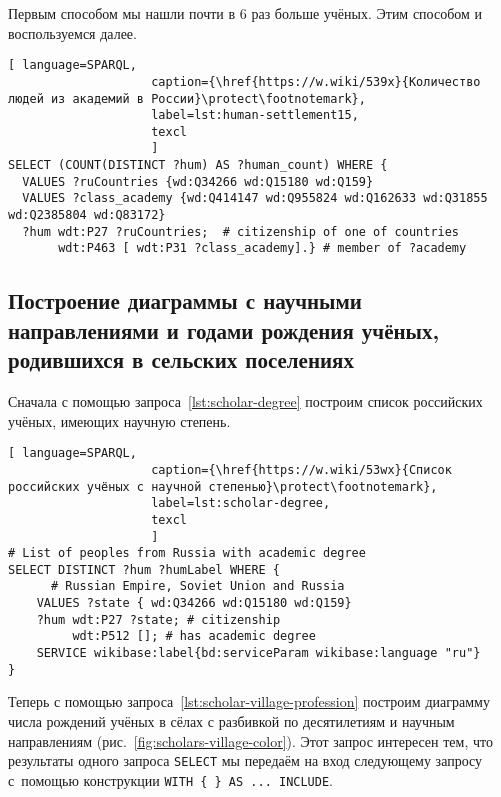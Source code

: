 Первым способом мы нашли почти в 6 раз больше учёных. 
Этим способом и воспользуемся далее. 

\begin{lstlisting}[ language=SPARQL, 
                    caption={\href{https://w.wiki/539x}{Количество людей из академий в России}\protect\footnotemark},
                    label=lst:human-settlement15,
                    texcl 
                    ]
SELECT (COUNT(DISTINCT ?hum) AS ?human_count) WHERE {
  VALUES ?ruCountries {wd:Q34266 wd:Q15180 wd:Q159}
  VALUES ?class_academy {wd:Q414147 wd:Q955824 wd:Q162633 wd:Q31855 wd:Q2385804 wd:Q83172}
  ?hum wdt:P27 ?ruCountries;  # citizenship of one of countries
       wdt:P463 [ wdt:P31 ?class_academy].} # member of ?academy
\end{lstlisting}%





\subsection{Построение диаграммы с научными направлениями 
и годами рождения учёных, \mbox{родившихся} в сельских поселениях}

Сначала с помощью запроса~\ref{lst:scholar-degree} 
построим список российских учёных, имеющих научную степень.

\begin{lstlisting}[ language=SPARQL, 
                    caption={\href{https://w.wiki/53wx}{Список российских учёных с научной степенью}\protect\footnotemark},
                    label=lst:scholar-degree,
                    texcl 
                    ]
# List of peoples from Russia with academic degree
SELECT DISTINCT ?hum ?humLabel WHERE {
      # Russian Empire, Soviet Union and Russia
    VALUES ?state { wd:Q34266 wd:Q15180 wd:Q159}
    ?hum wdt:P27 ?state; # citizenship
         wdt:P512 []; # has academic degree 
    SERVICE wikibase:label{bd:serviceParam wikibase:language "ru"}
}
\end{lstlisting}%



Теперь с помощью запроса~\ref{lst:scholar-village-profession} 
построим диаграмму числа рождений учёных в сёлах с разбивкой по десятилетиям %
и научным направлениям (рис.~\ref{fig:scholars-village-color}). 
Этот запрос интересен тем, что результаты одного запроса \lstinline|SELECT| 
мы передаём на вход следующему запросу с~помощью конструкции \lstinline|WITH { } AS ... INCLUDE|. 

